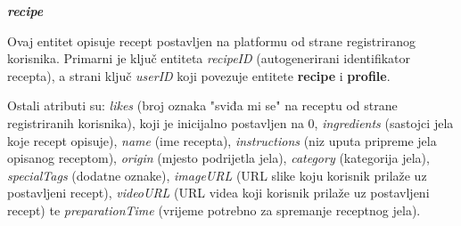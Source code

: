     
\noindent \textbf{\textit{recipe}}\\
\begin{samepage}
Ovaj entitet opisuje recept postavljen na platformu od strane registriranog korisnika. Primarni je ključ entiteta \textit{recipeID} (autogenerirani identifikator recepta), a strani ključ \textit{userID} koji povezuje entitete \textbf{recipe} i \textbf{profile}.
\end{samepage}
\eject

\begin{samepage}
\noindent Ostali atributi su: \textit{likes} (broj oznaka "sviđa mi se" na receptu od strane registriranih korisnika), koji je inicijalno postavljen na 0, \textit{ingredients} (sastojci jela koje recept opisuje), \textit{name} (ime recepta), \textit{instructions} (niz uputa pripreme jela opisanog receptom), \textit{origin} (mjesto podrijetla jela), \textit{category} (kategorija jela), \textit{specialTags} (dodatne oznake), \textit{imageURL} (URL slike koju korisnik prilaže uz postavljeni recept), \textit{videoURL} (URL videa koji korisnik prilaže uz postavljeni recept) te \textit{preparationTime} (vrijeme potrebno za spremanje receptnog jela).
\end{samepage}
    
